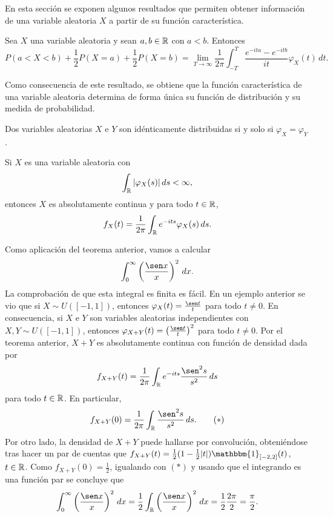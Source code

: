 \documentclass[a4paper, 11pt, extrafontsizes]{memoir}
\begin{document}
En esta sección se exponen algunos resultados que permiten obtener información de una variable aleatoria $X$ a partir de su función característica.

\begin{theorem}
    Sea $X$ una variable aleatoria y sean $a,b \in \mathbb R$ con $a<b$. Entonces
    \[P(a<X<b)+\frac{1}{2}P(X=a)+\frac{1}{2}P(X=b) = \lim_{T \to \infty} \frac{1}{2\pi}\int_{-T}^T\frac{e^{-ita}-e^{-itb}}{it}\varphi_X(t)\, dt.\]
\end{theorem}

Como consecuencia de este resultado, se obtiene que la función característica de una variable aleatoria determina de forma única su función de distribución y su medida de probabilidad.

\begin{theorem}
    Dos variables aleatorias $X$ e $Y$ son idénticamente distribuidas si y solo si $\varphi_X = \varphi_Y$.
\end{theorem}

\begin{theorem}
    Si $X$ es una variable aleatoria con
    \[\int_\mathbb R |\varphi_X(s)| \, ds< \infty,\]
    entonces $X$ es absolutamente continua y para todo $t \in \mathbb R$,
    \[f_X(t)=\frac{1}{2\pi}\int_\mathbb R e^{-its}\varphi_X(s) \, ds.\]
\end{theorem}

\begin{example}
    Como aplicación del teorema anterior, vamos a calcular
    \[\int_0^\infty \left(\frac{\sen x}{x}\right)^2 \, dx.\]
    La comprobación de que esta integral es finita es fácil. En un ejemplo anterior se vio que si $X \sim U([-1,1])$, entonces $\varphi_X(t) = \frac{\sen t}{t}$ para todo $t \neq 0$. En consecuencia, si $X$ e $Y$ son variables aleatorias independientes con $X,Y \sim U([-1,1])$, entonces $\varphi_{X+Y}(t)=\left(\frac{\sen t}{t}\right)^2$ para todo $t \neq 0$. Por el teorema anterior, $X+Y$ es absolutamente continua con función de densidad dada por
    \[f_{X+Y}(t) = \frac{1}{2\pi}\int_\R e^{-its}\frac{\sen^2 s}{s^2}\,ds\]
    para todo $t \in \mathbb R$. En particular,
    \[f_{X+Y}(0) = \frac{1}{2\pi}\int_\R \frac{\sen^2 s}{s^2}\,ds. \tag{$\ast$}\]
    Por otro lado, la densidad de $X+Y$ puede hallarse por convolución, obteniéndose tras hacer un par de cuentas que $f_{X+Y}(t) = \frac{1}{2}(1-\frac{1}{2}|t|)\mathbbm{1}_{[-2,2]}(t)$, $t \in \mathbb R$. Como $f_{X+Y}(0) = \frac{1}{2}$, igualando con $(\ast)$ y usando que el integrando es una función par se concluye que
    \[\int_0^\infty \left(\frac{\sen x}{x}\right)^2 \, dx = \frac{1}{2}\int_\R \left(\frac{\sen x}{x}\right)^2 \, dx = \frac{1}{2}\frac{2\pi }{2} = \frac{\pi}{2}.\]
\end{example}
\end{document}
